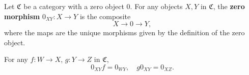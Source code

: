 Let $\mathfrak{C}$ be a category with a zero object $0$. For any objects $X, Y$ in $\mathfrak{C}$, the \textbf{zero morphism} $0_{XY}: X \to Y$ is the composite
$$X \to 0 \to Y,$$
where the maps are the unique morphisms given by the definition of the zero object.

For any $f: W \to X$, $g: Y \to Z$ in $\mathfrak{C}$,
$$0_{XY} f = 0_{WY}, \quad g 0_{XY} = 0_{XZ}.$$
